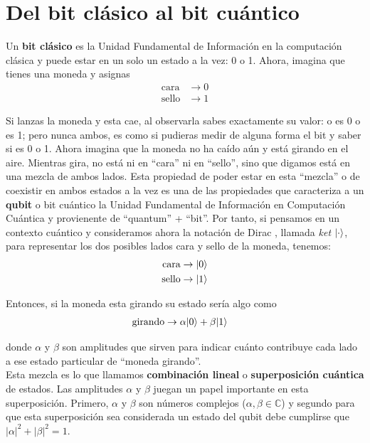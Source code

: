 \section{Del bit clásico al bit cuántico}

Un \textbf{bit clásico} es la Unidad Fundamental de Información en la computación clásica y puede estar en un solo un estado a la vez: 0 o 1. Ahora, imagina que tienes una moneda y asignas
\begin{align*}
	\mbox{cara} & \to 0 \\
	\mbox{sello} & \to 1
\end{align*}

Si lanzas la moneda y esta cae, al observarla sabes exactamente su valor: o es 0 o es 1; pero nunca ambos, es como si pudieras medir de alguna forma el bit y saber si es 0 o 1. Ahora imagina que la moneda no ha caído aún y está girando en el aire. Mientras gira, no está ni en “cara” ni en ``sello'', sino que digamos está en una mezcla de ambos lados. Esta propiedad de poder estar en esta ``mezcla'' o de coexistir en ambos estados a la vez es una de las propiedades que caracteriza a un \textbf{qubit} o bit cuántico la Unidad Fundamental de Información en Computación Cuántica y provienente de ``quantum'' + ``bit''. Por tanto, si pensamos en un contexto cuántico y consideramos ahora la notación de Dirac \cite{mcmahon2008quantum, wong2021introduction}, llamada \textit{ket} $|\cdot\rangle$, para representar los dos posibles lados cara y sello de la moneda, tenemos:
\begin{align*}
	\mbox{cara} & \to |0\rangle \\
	\mbox{sello} & \to |1\rangle
\end{align*}

Entonces, si la moneda esta girando su estado sería algo como
\begin{align*}
	\mbox{girando} & \to \alpha|0\rangle + \beta|1\rangle
\end{align*}

donde $\alpha$ y $\beta$ son amplitudes que sirven para indicar cuánto contribuye cada lado a ese estado particular de ``moneda girando''. \\

Esta mezcla es lo que llamamos \textbf{combinación lineal} o \textbf{superposición cuántica} de estados. Las amplitudes $\alpha$ y $\beta$ juegan un papel importante en esta superposición. Primero, $\alpha$ y $\beta$ son números complejos ($\alpha, \beta \in \mathbb{C}$) y segundo para que esta superposición sea considerada un estado del qubit debe cumplirse que $|\alpha|^2 + |\beta|^2 = 1$. \\

